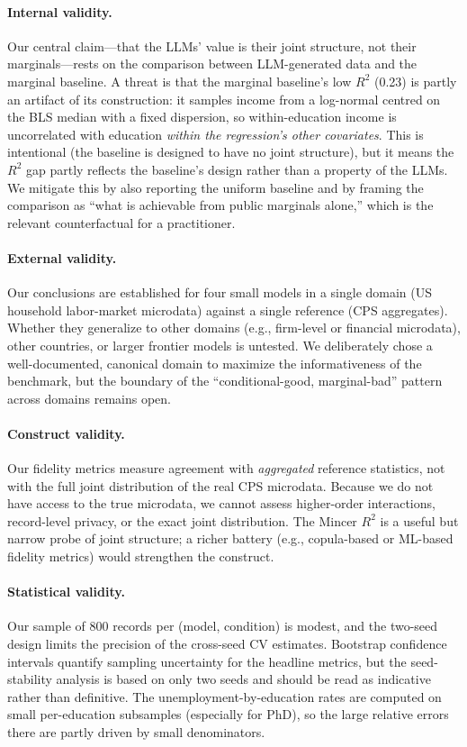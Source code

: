 \documentclass[11pt]{article}
\begin{document}
\paragraph{Internal validity.}
Our central claim---that the LLMs' value is their joint structure, not their marginals---rests on the comparison between LLM-generated data and the marginal baseline.
A threat is that the marginal baseline's low $R^2$ (0.23) is partly an artifact of its construction: it samples income from a log-normal centred on the BLS median with a fixed dispersion, so within-education income is uncorrelated with education \emph{within the regression's other covariates}.
This is intentional (the baseline is designed to have no joint structure), but it means the $R^2$ gap partly reflects the baseline's design rather than a property of the LLMs.
We mitigate this by also reporting the uniform baseline and by framing the comparison as ``what is achievable from public marginals alone,'' which is the relevant counterfactual for a practitioner.

\paragraph{External validity.}
Our conclusions are established for four small models in a single domain (US household labor-market microdata) against a single reference (CPS aggregates).
Whether they generalize to other domains (e.g., firm-level or financial microdata), other countries, or larger frontier models is untested.
We deliberately chose a well-documented, canonical domain to maximize the informativeness of the benchmark, but the boundary of the ``conditional-good, marginal-bad'' pattern across domains remains open.

\paragraph{Construct validity.}
Our fidelity metrics measure agreement with \emph{aggregated} reference statistics, not with the full joint distribution of the real CPS microdata.
Because we do not have access to the true microdata, we cannot assess higher-order interactions, record-level privacy, or the exact joint distribution.
The Mincer $R^2$ is a useful but narrow probe of joint structure; a richer battery (e.g., copula-based or ML-based fidelity metrics) would strengthen the construct.

\paragraph{Statistical validity.}
Our sample of 800 records per (model, condition) is modest, and the two-seed design limits the precision of the cross-seed CV estimates.
Bootstrap confidence intervals quantify sampling uncertainty for the headline metrics, but the seed-stability analysis is based on only two seeds and should be read as indicative rather than definitive.
The unemployment-by-education rates are computed on small per-education subsamples (especially for PhD), so the large relative errors there are partly driven by small denominators.
\end{document}
